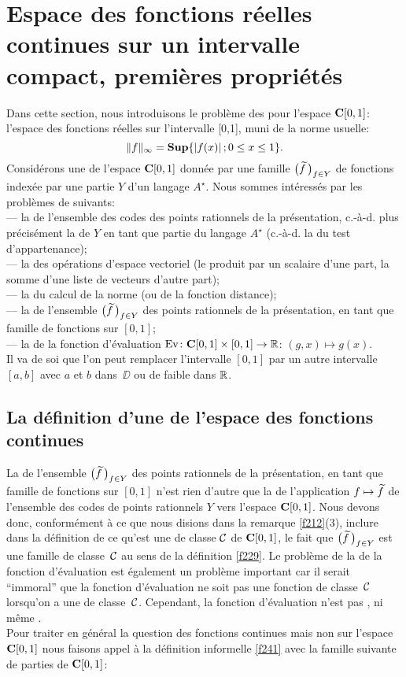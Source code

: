 \section[Fonctions réelles continues sur un intervalle compact 
\ldots]{Espace des fonctions réelles continues sur un intervalle compact, 
premières propriétés}\label{fsec3}
Dans cette section, nous introduisons le problème des \rps  pour l'espace  
${{\bf C}[0,1]}$:  l'espace des fonctions réelles \unicos sur l'intervalle  [0,1], muni 
de la norme usuelle:
\[
\lVert f \rVert_{\infty} = {\bf Sup}\{ \left|{f(x)}\right| ; 0 \leq x \leq 1 \}.
\] 
Considérons une \rp  de l'espace  ${{\bf C}[0,1]}$  donnée par une famille  
$\big(\widetilde{f}\,\big)_{f \in Y}$  de fonctions \unicos indexée par une partie  $Y$  
d'un langage $A^{\star}$. Nous sommes intéressés par les problèmes de 
\com suivants:\\
--- la \com de l'ensemble des codes des points rationnels de la 
présentation, c.-à-d. plus précisément la \com de  $Y$  en tant que 
partie du langage  $A^{\star}$   (c.-à-d. la \com du test d'appartenance);\\
--- la \com des opérations d'espace vectoriel (le produit par un scalaire 
d'une part, la somme d'une liste de vecteurs d'autre part);\\
--- la \com du calcul de la norme (ou de la fonction distance);\\ 
--- la \com de l'ensemble  $\big(\widetilde{f}\,\big)_{f \in Y}$  des points rationnels de 
la présentation, en tant que famille de fonctions \unicos sur  $[0,1]$;\\
--- la \com de la fonction d'évaluation  ${\rm Ev} \colon  {{\bf C}[0,1]} \times [0,1] 
\rightarrow \mathbb {R}$: $ (g,x) \mapsto g(x)$.\\
Il va de soi que l'on peut remplacer l'intervalle  $[0,1]$  par un autre 
intervalle  $[a,b]$  avec  $a$  et  $b$  dans~$\DD$  ou de faible \com dans  
$\mathbb {R}$. 

\subsection{La définition d'une \rp  de l'espace des fonctions 
continues}\label{fsubsec31} 
La \com de l'ensemble  $\big(\widetilde{f}\,\big)_{f \in Y}$  des points rationnels de la 
présentation, en tant que famille de fonctions \unicos sur  $[0,1]$    n'est 
rien d'autre que la \com de l'application  $f \mapsto \widetilde{f}$    de 
l'ensemble des codes de points rationnels $Y$ vers l'espace  ${{\bf C}[0,1]}$.  Nous 
devons donc, conformément à ce que nous disions dans la remarque 
\ref{f212}(3), inclure dans la définition de ce qu'est une \rp  de classe  
${{\cal C}}$   de  ${{\bf C}[0,1]}$, le fait que  $\big(\widetilde{f}\,\big)_{f \in Y}$  est une famille 
\uni de classe~${{\cal C}}$   au sens de la définition \ref{f229}.
Le problème de la \com de la fonction d'évaluation est également un 
problème important car il serait ``immoral''  que la fonction d'évaluation ne 
soit pas une fonction de classe~${{\cal C}}$   lorsqu'on a une \rp  de classe~${{\cal C}}$. 
Cependant, la fonction d'évaluation n'est pas \unico, ni même 
\loca \unico.\\
Pour traiter en général la question des fonctions continues mais 
non \loca \unicos sur l'espace  ${{\bf C}[0,1]}$  nous faisons appel à la définition 
informelle \ref{f241} avec la famille suivante de parties de  ${{\bf C}[0,1]}$:  

